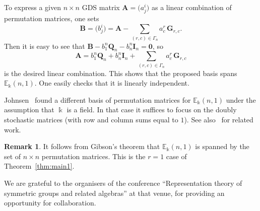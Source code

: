 \documentclass[10pt]{article}
\theoremstyle{definition}
\newtheorem{rema}[theorem]{Remark}
\providecommand{\longthanks}[1]{\par\smallskip\noindent #1\par\smallskip}
\newcommand{\E}{\mathbb{E}}
\newcommand{\bA}{\mathbf{A}}
\newcommand{\bB}{\mathbf{B}}
\newcommand{\bQ}{\mathbf{Q}}
\newcommand{\bI}{\mathbf{I}}
\newcommand{\bG}{\mathbf{G}}
\newcommand{\bzero}{\mathbf{0}}
\begin{document}
To express a given $n \times n$ GDS matrix $\bA = \big(a^i_j \big)$ as
a linear combination of permutation matrices, one sets
\begin{equation}
\bB = \big(b^i_j \big) = \bA - \textstyle \sum_{(r,c) \in \Gamma_n}
a^r_c \, \bG_{r,c}.
\end{equation}
Then it is easy to see that $\bB - b^n_1 \bQ_n - b^n_n \bI_n = \bzero$, so
\begin{equation}
\bA = b^n_1 \bQ_n + b^n_n \bI_n + \textstyle \sum_{(r,c) \in \Gamma_n}
a^r_c \, \bG_{r,c}
\end{equation}
is the desired linear combination. This shows that the proposed basis
spans $\E_\Bbbk(n,1)$. One easily checks that it is linearly
independent.


Johnsen~\cite{Johnsen} found a different basis of permutation matrices
for $\E_\Bbbk(n,1)$ under the assumption that $\Bbbk$ is a field. In
that case it suffices to focus on the doubly stochastic matrices (with
row and column sums equal to $1$). See also~\cite{Lai} for related work.

\begin{rema}
 It follows from Gibson's theorem that $\E_\Bbbk(n,1)$ is spanned by
 the set of $n \times n$ permutation matrices. This is the $r=1$
 case of Theorem~\ref{thm:main1}. 
\end{rema}



\longthanks{We are grateful to the organisers of the conference ``Representation theory of symmetric groups and related algebras'' at that venue, for providing an opportunity for collaboration.}
\end{document}
